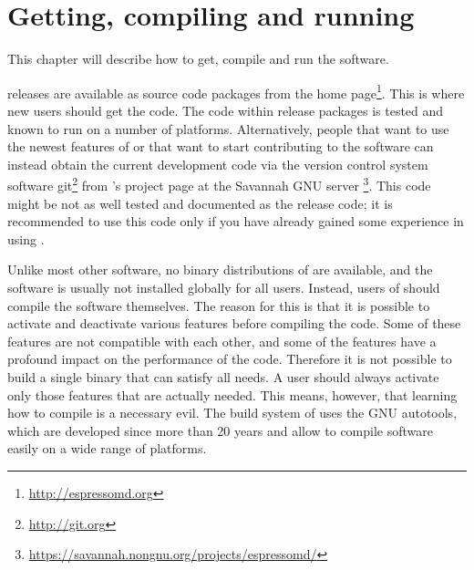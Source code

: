 %  
%   
%  
%  
%
\chapter{Getting, compiling and running \es}
\label{chap:install}

This chapter will describe how to get, compile and run the \es
software.  

\es releases are available as source code packages from the \es home
page\footnote{\url{http://espressomd.org}}.  This is where new users
should get the code.  The code within release packages is tested and
known to run on a number of platforms.  Alternatively, people that
want to use the newest features of \es or that want to start
contributing to the software can instead obtain the current
development code via the version control system software
\textsf{git}\footnote{\url{http://git.org}} from \es's project page at
the Savannah GNU server
\footnote{\url{https://savannah.nongnu.org/projects/espressomd/}}.
This code might be not as well tested and documented as the release
code; it is recommended to use this code only if you have already
gained some experience in using \es.

Unlike most other software, no binary distributions of \es are
available, and the software is usually not installed globally for all
users.  Instead, users of \es should compile the software themselves.
 The reason for this is that it is possible to
activate and deactivate various features before compiling the code.
Some of these features are not compatible with each other, and some of
the features have a profound impact on the performance of the code.
Therefore it is not possible to build a single binary that can satisfy
all needs.  A user should always activate only those features that are
actually needed.  This means, however, that learning how to compile
\es is a necessary evil.  The build system of \es uses the GNU
autotools, which are developed since more than 20 years and allow to
compile software easily on a wide range of platforms.

